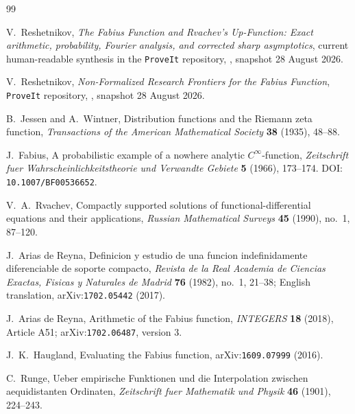 \documentclass[11pt,oneside]{article}
\theoremstyle{definition}
\theoremstyle{remark}
\begin{document}
\begin{thebibliography}{99}

V.~Reshetnikov,
\newblock \emph{The Fabius Function and Rvachev's Up-Function: Exact arithmetic,
probability, Fourier analysis, and corrected sharp asymptotics},
\newblock current human-readable synthesis in the \texttt{ProveIt} repository,
, snapshot 28 August 2026.

V.~Reshetnikov,
\newblock \emph{Non-Formalized Research Frontiers for the Fabius Function},
\newblock \texttt{ProveIt} repository,
, snapshot 28 August 2026.

B.~Jessen and A.~Wintner,
\newblock Distribution functions and the Riemann zeta function,
\newblock \emph{Transactions of the American Mathematical Society} \textbf{38} (1935), 48--88.

J.~Fabius,
\newblock A probabilistic example of a nowhere analytic $C^\infty$-function,
\newblock \emph{Zeitschrift fuer Wahrscheinlichkeitstheorie und Verwandte Gebiete}
\textbf{5} (1966), 173--174.
\newblock DOI: \nolinkurl{10.1007/BF00536652}.

V.~A.~Rvachev,
\newblock Compactly supported solutions of functional-differential equations and their applications,
\newblock \emph{Russian Mathematical Surveys} \textbf{45} (1990), no.~1, 87--120.

J.~Arias de Reyna,
\newblock Definicion y estudio de una funcion indefinidamente diferenciable de soporte compacto,
\newblock \emph{Revista de la Real Academia de Ciencias Exactas, Fisicas y Naturales de Madrid}
\textbf{76} (1982), no.~1, 21--38;
English translation, arXiv:\nolinkurl{1702.05442} (2017).

J.~Arias de Reyna,
\newblock Arithmetic of the Fabius function,
\newblock \emph{INTEGERS} \textbf{18} (2018), Article A51;
arXiv:\nolinkurl{1702.06487}, version 3.

J.~K.~Haugland,
\newblock Evaluating the Fabius function,
\newblock arXiv:\nolinkurl{1609.07999} (2016).

C.~Runge,
\newblock Ueber empirische Funktionen und die Interpolation zwischen aequidistanten Ordinaten,
\newblock \emph{Zeitschrift fuer Mathematik und Physik} \textbf{46} (1901), 224--243.


\end{thebibliography}
\end{document}
